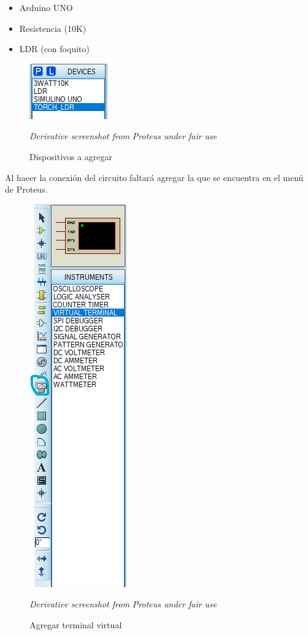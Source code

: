 \documentclass{article}
\begin{document}
\begin{itemize}
\item Arduino UNO
\item Resistencia (10K)
\item LDR (con foquito)
\end{itemize}

\begin{figure}[H]
\centering
\includegraphics[width=0.1\paperwidth]{images/proteus-devices}
\caption{Dispositivos a agregar}\footnotesize
\textit{Derivative screenshot from Proteus under fair use}
\end{figure}

Al hacer la conexión del circuito faltará agregar la 
que se encuentra en el menú  de Proteus.

\begin{figure}[H]
\centering
\includegraphics[width=0.1\paperwidth]{images/proteus-virtual-terminal}
\caption{Agregar terminal virtual}\footnotesize
\textit{Derivative screenshot from Proteus under fair use}
\end{figure}
\end{document}
